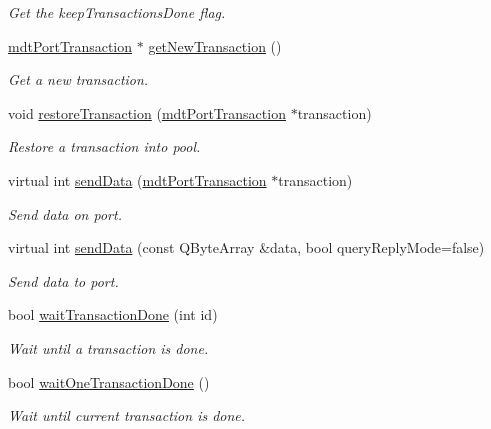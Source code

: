 \begin{DoxyCompactItemize}
\begin{DoxyCompactList}\small\item\em Get the keep\-Transactions\-Done flag. \end{DoxyCompactList}\item 
\hyperlink{classmdt_port_transaction}{mdt\-Port\-Transaction} $\ast$ \hyperlink{classmdt_port_manager_a75ebd3d1859e3ed38b9558981e53aac4}{get\-New\-Transaction} ()
\begin{DoxyCompactList}\small\item\em Get a new transaction. \end{DoxyCompactList}\item 
void \hyperlink{classmdt_port_manager_a5fea4a9b8e94d38e8ec699dba05c7ca8}{restore\-Transaction} (\hyperlink{classmdt_port_transaction}{mdt\-Port\-Transaction} $\ast$transaction)
\begin{DoxyCompactList}\small\item\em Restore a transaction into pool. \end{DoxyCompactList}\item 
virtual int \hyperlink{classmdt_port_manager_ad98399edba146af5cf32a9002094385c}{send\-Data} (\hyperlink{classmdt_port_transaction}{mdt\-Port\-Transaction} $\ast$transaction)
\begin{DoxyCompactList}\small\item\em Send data on port. \end{DoxyCompactList}\item 
virtual int \hyperlink{classmdt_port_manager_a445b27f0819158f67f1bd548cdd2fedf}{send\-Data} (const Q\-Byte\-Array \&data, bool query\-Reply\-Mode=false)
\begin{DoxyCompactList}\small\item\em Send data to port. \end{DoxyCompactList}\item 
bool \hyperlink{classmdt_port_manager_a5551802de2c08632078f2cc0e2607913}{wait\-Transaction\-Done} (int id)
\begin{DoxyCompactList}\small\item\em Wait until a transaction is done. \end{DoxyCompactList}\item 
bool \hyperlink{classmdt_port_manager_af60f089baded850018cbb90645c8e547}{wait\-One\-Transaction\-Done} ()
\begin{DoxyCompactList}\small\item\em Wait until current transaction is done. \end{DoxyCompactList}\item 

\end{DoxyCompactItemize}
